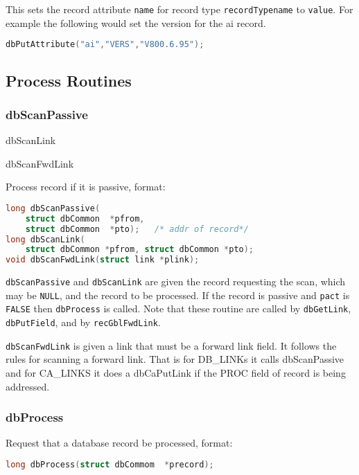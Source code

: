 This sets the record attribute \verb|name| for record type \verb|recordTypename| to \verb|value|.
For example the following would set the version for the ai record.

\begin{lstlisting}[language=C]
dbPutAttribute("ai","VERS","V800.6.95");
\end{lstlisting}

\subsection{Process Routines}

\subsubsection{dbScanPassive}

dbScanLink

dbScanFwdLink

Process record if it is passive, format:

\begin{lstlisting}[language=C]
long dbScanPassive(
    struct dbCommon  *pfrom,
    struct dbCommon  *pto);   /* addr of record*/
long dbScanLink(
    struct dbCommon *pfrom, struct dbCommon *pto);
void dbScanFwdLink(struct link *plink);
\end{lstlisting}

 \verb|dbScanPassive| and \verb|dbScanLink| are given the record requesting the scan, which may be \verb|NULL|, and the record to be processed.
If the record is passive and \verb|pact| is \verb|FALSE| then \verb|dbProcess| is called.
Note that these routine are called by \verb|dbGetLink|, \verb|dbPutField|, and by \verb|recGblFwdLink|.

\verb|dbScanFwdLink| is given a link that must be a forward link field.
It follows the rules for scanning a forward link.
That is for DB\_LINKs it calls dbScanPassive and for CA\_LINKS it does a dbCaPutLink if the PROC field of record is being addressed.

\subsubsection{dbProcess }

Request that a database record be processed, format:

\begin{lstlisting}[language=C]
long dbProcess(struct dbCommom  *precord);
\end{lstlisting}

